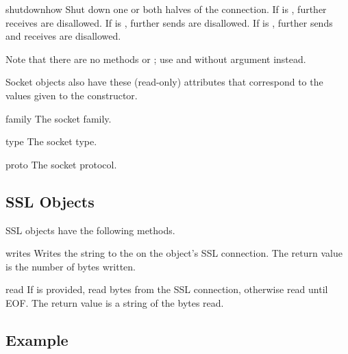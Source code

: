 \begin{methoddesc}[socket]{shutdown}{how}
Shut down one or both halves of the connection.  If  is
, further receives are disallowed.  If  is ,
further sends are disallowed.  If  is , further sends
and receives are disallowed.
\end{methoddesc}

Note that there are no methods  or ;
use  and  without  argument
instead.


Socket objects also have these (read-only) attributes that correspond
to the values given to the  constructor.

\begin{memberdesc}[socket]{family}
The socket family.
\end{memberdesc}

\begin{memberdesc}[socket]{type}
The socket type.
\end{memberdesc}

\begin{memberdesc}[socket]{proto}
The socket protocol.
\end{memberdesc}


\subsection{SSL Objects \label{ssl-objects}}

SSL objects have the following methods.

\begin{methoddesc}{write}{s}
Writes the string  to the on the object's SSL connection.
The return value is the number of bytes written.
\end{methoddesc}

\begin{methoddesc}{read}{}
If  is provided, read  bytes from the SSL connection, otherwise
read until EOF. The return value is a string of the bytes read.
\end{methoddesc}

\subsection{Example \label{socket-example}}

